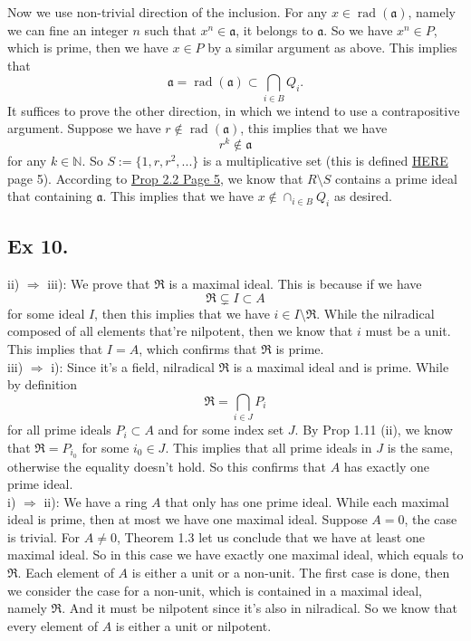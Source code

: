Now we use non-trivial direction of the inclusion. For any $x\in \operatorname{rad}(\mathfrak a)$, namely we can fine an integer $n$ such that $x^n\in \mathfrak a$, it belongs to $\mathfrak a$. So we have $x^n\in P$, which is prime, then we have $x\in P$ by a similar argument as above. This implies that 
$$\mathfrak a=\operatorname{rad}(\mathfrak a)\subset \bigcap_{i\in B}Q_i.$$
It suffices to prove the other direction, in which we intend to use a contrapositive argument. Suppose we have $r\notin \operatorname{rad}(\mathfrak a)$, this implies that we have 
$$r^k\notin \mathfrak a$$ for any $k\in \mathbb N$. So $S:=\{1,r,r^2,...\}$ is a multiplicative set (this is defined \href{https://www.jmilne.org/math/xnotes/CA.pdf}{HERE} page 5). 
According to \href{https://www.jmilne.org/math/xnotes/CA.pdf}{Prop 2.2 Page 5}, we know that $R\setminus S$ contains a prime ideal that containing $\mathfrak a$. This implies that we have $x\notin \cap_{i\in B}Q_i$ as desired.



\subsection{Ex 10.}

ii) $\Rightarrow$ iii): We prove that $\mathfrak R$ is a maximal ideal. This is because if we have
$$\mathfrak R\subsetneq I\subset A$$ for some ideal $I$, then this implies that we have $i\in I\setminus \mathfrak R$. While the nilradical composed of all elements that're nilpotent, then we know that $i$ must be a unit. This implies that $I=A$, which confirms that $\mathfrak R$ is prime.\\

\noindent iii) $\Rightarrow$ i): Since it's a field, nilradical $\mathfrak R$ is a maximal ideal and is prime.
While by definition 
$$\mathfrak R=\bigcap_{i\in J} P_i$$ for all prime ideals $P_i\subset A$ and for some index set $J$. By Prop 1.11 (ii), we know that $\mathfrak R=P_{i_0}$ for some $i_0\in J$. This implies that all prime ideals in $J$ is the same, otherwise the equality doesn't hold. So this confirms that $A$ has exactly one prime ideal.\\

\noindent i) $\Rightarrow$ ii): We have a ring $A$ that only has one prime ideal. While each maximal ideal is prime, then at most we have one maximal ideal. Suppose $A=0$, the case is trivial. For $A\neq 0$, Theorem 1.3 let us conclude that we have at least one maximal ideal. So in this case we have exactly one maximal ideal, which equals to $\mathfrak R$. Each element of $A$ is either a unit or a non-unit. The first case is done, then we consider the case for a non-unit, which is contained in a maximal ideal, namely $\mathfrak R$. And it must be nilpotent since it's also in nilradical. So we know that every element of $A$ is either a unit or nilpotent.

